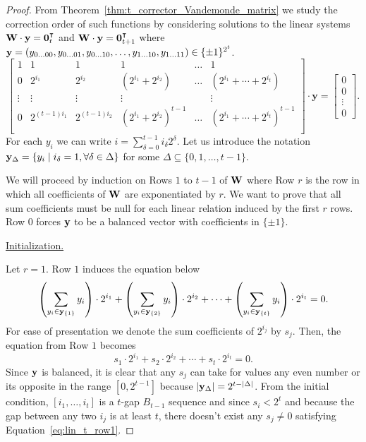 \begin{proof}
From Theorem~\ref{thm:t_corrector_Vandemonde_matrix} we study the correction
order of such functions by considering solutions to the linear systems
$\mathbf{W} \cdot \mathbf{y} = \mathbf{0}^\intercal_t$ and
$\mathbf{W} \cdot \mathbf{y} = \mathbf{0}^\intercal_{t+1}$ where
$\mathbf{y} = (y_{0\ldots00}, y_{0\ldots01}, y_{0\ldots10}, \ldots, y_{1\ldots10}, y_{1\ldots11}) \in \{\pm1\}^{2^t}$.
\begin{equation}\label{eq:vand_t}
        \begin{bmatrix}
            1 & 1 & 1 & 1 & \ldots & 1\\
            0 &  2^{i_1} & 2^{i_2} & (2^{i_1} + 2^{i_2}) & \ldots & (2^{i_1} + \cdots + 2^{i_t})\\
            \vdots & \vdots & \vdots & \vdots &  & \vdots\\
            0 & 2^{(t-1)i_1} & 2^{(t-1)i_2} & (2^{i_1} + 2^{i_2})^{t-1} & \ldots & (2^{i_1} + \cdots + 2^{i_t})^{t-1}\\
        \end{bmatrix}
        \cdot \mathbf{y} = \begin{bmatrix}
            0\\0\\\vdots\\0
        \end{bmatrix}.
    \end{equation}
For each $y_i$ we can write $i = \sum_{\delta=0}^{t-1}i_\delta 2^\delta$.
Let us introduce the notation $\mathbf{y}_\Delta = \{y_i \mid i_\delta = 1, \forall \delta \in \Delta\}$
for some $\Delta \subseteq \{0, 1, \ldots, t-1\}$.

We will proceed by induction on Rows $1$ to $t-1$ of $\mathbf{W}$ where Row $r$ is
the row in which all coefficients of $\mathbf{W}$ are exponentiated by $r$. We want
to prove that all sum coefficients must be null for each linear relation induced
by the first $r$ rows. Row $0$ forces $\mathbf{y}$ to be a balanced vector with
coefficients in $\{\pm 1\}$.

\underline{Initialization.}

Let $r = 1$. Row $1$ induces the equation below
\begin{equation*}
    \left(\sum_{y_i \in \mathbf{y}_{\{1\}}} y_i\right) \cdot 2^{i_1} + \left(\sum_{y_i \in \mathbf{y}_{\{2\}}} y_i\right) \cdot 2^{i_2} + \cdots + \left(\sum_{y_i \in \mathbf{y}_{\{t\}}} y_i\right) \cdot 2^{i_t} = 0.
\end{equation*}
For ease of presentation we denote the sum coefficients of $2^{i_j}$ by $s_j$.
Then, the equation from Row $1$ becomes
\begin{equation}\label{eq:lin_t_row1}
    s_1 \cdot 2^{i_1} + s_2 \cdot 2^{i_2} + \cdots + s_t \cdot 2^{i_t} = 0.
\end{equation}
Since $\mathbf{y}$ is balanced, it is clear that any $s_j$ can take for values any
even number or its opposite in the range $[0, 2^{t-1}]$ because
$|\mathbf{y}_\Delta| = 2^{t-|\Delta|}$. From the initial condition,
$[i_1, \ldots, i_t]$ is a $t$-gap $B_{t-1}$ sequence and since $s_i < 2^{t}$ and
because the gap between any two $i_j$ is at least $t$, there doesn't exist
any $s_j \neq 0$ satisfying Equation~\ref{eq:lin_t_row1}.


\end{proof}

